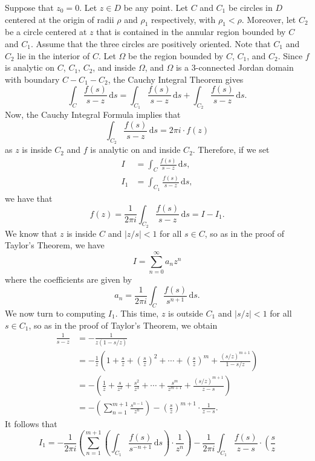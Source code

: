\documentclass[10pt]{article}
\makeatletter
\newcommand{\dd}{\,\mathrm{d}}
\theoremstyle{newstyle}
\newenvironment{pf}[1][\proofname]{\par
  \pushQED{\qed}%
  \normalfont \topsep0\p@\relax
  \trivlist
  \item[\hskip\labelsep\scshape
  #1\@addpunct{.}]\ignorespaces
}{%
  \popQED\endtrivlist\@endpefalse
}
\makeatother
\begin{document}
\begin{pf}
Suppose that $z_0 = 0$. Let $z \in D$ be any point. Let $C$ and $C_1$ be circles in $D$ 
centered at the origin of radii $\rho$ and $\rho_1$ respectively, with $\rho_1 < \rho$. 
Moreover, let $C_2$ be a circle centered at $z$ that is contained in the annular region 
bounded by $C$ and $C_1$. Assume that the three circles are positively oriented. 
Note that $C_1$ and $C_2$ lie in the interior of $C$. Let $\Omega$ be the region 
bounded by $C$, $C_1$, and $C_2$. Since $f$ is analytic on $C$, $C_1$, $C_2$, and inside $\Omega$, 
and $\Omega$ is a $3$-connected Jordan domain with boundary $C - C_1 - C_2$, the Cauchy Integral 
Theorem gives 
\[ \int_C \frac{f(s)}{s-z}\dd s = \int_{C_1} \frac{f(s)}{s-z}\dd s + \int_{C_2} \frac{f(s)}{s-z}\dd s. \]
Now, the Cauchy Integral Formula implies that 
\[ \int_{C_2} \frac{f(s)}{s-z}\dd s = 2\pi i \cdot f(z) \]
as $z$ is inside $C_2$ and $f$ is analytic on and inside $C_2$. Therefore, if we set 
\begin{align*}
    I &= \int_C \frac{f(s)}{s-z}\dd s, \\
    I_1 &= \int_{C_1} \frac{f(s)}{s-z}\dd s,
\end{align*}
we have that 
\[ f(z) = \frac{1}{2\pi i} \int_{C_2} \frac{f(s)}{s-z}\dd s = I - I_1. \]
We know that $z$ is inside $C$ and $|z/s| < 1$ for all $s \in C$, so as in the proof of Taylor's 
Theorem, we have 
\[ I = \sum_{n=0}^\infty a_n z^n \]
where the coefficients are given by 
\[ a_n = \frac{1}{2\pi i} \int_C \frac{f(s)}{s^{n+1}}\dd s. \]
We now turn to computing $I_1$. This time, $z$ is outside $C_1$ and $|s/z| < 1$ for all $s \in C_1$, 
so as in the proof of Taylor's Theorem, we obtain 
\begin{align*}
    \frac{1}{s-z} 
    &= -\frac{1}{z(1-s/z)} \\
    &= -\frac1z \left( 1 + \frac sz + \left( \frac sz \right)^2 + \cdots + \left( \frac sz \right)^m 
    + \frac{(s/z)^{m+1}}{1-s/z} \right) \\
    &= - \left( \frac1z + \frac s{z^2} + \frac{s^2}{z^3} + \cdots + \frac{s^m}{z^{m+1}} + 
    \frac{(s/z)^{m+1}}{z-s} \right) \\
    &= - \left( \sum_{n=1}^{m+1} \frac{s^{n-1}}{z^n} \right) - \left( \frac sz \right)^{m+1} 
    \cdot \frac{1}{z-s}. 
\end{align*}
It follows that 
\[ I_1 = -\frac{1}{2\pi i} \left( \sum_{n=1}^{m+1} \left( \int_{C_1} \frac{f(s)}{s^{-n+1}}\dd s \right)
\cdot \frac{1}{z^n} \right) - \frac{1}{2\pi i} \int_{C_1} \frac{f(s)}{z-s} \cdot \left( \frac sz 
\]
\end{pf}
\end{document}
